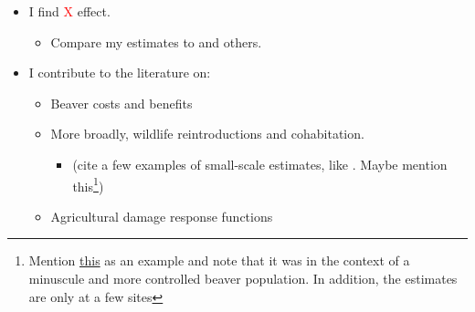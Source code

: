 \begin{itemize}
    \item I find \textcolor{red}{X} effect.
    \begin{itemize}
        \item Compare my estimates to \citep{hamilton_tayside_2015} and others.
    \end{itemize}
    \item I contribute to the literature on:
    \begin{itemize}
        \item Beaver costs and benefits
        \item More broadly, wildlife reintroductions and cohabitation. 
        \begin{itemize}
            \item (cite a few examples of small-scale estimates, like \citep{hamilton_tayside_2015}. Maybe mention this\footnote{Mention \href{https://www.exeter.ac.uk/media/universityofexeter/research/microsites/creww/riverottertrial/appendix1/Beavers_and_Agriculture.pdf}{this} as an example and note that it was in the context of a minuscule and more controlled beaver population. In addition, the estimates are only at a few sites})
        \end{itemize}
        \item Agricultural damage response functions 
    \end{itemize}
    
\end{itemize}